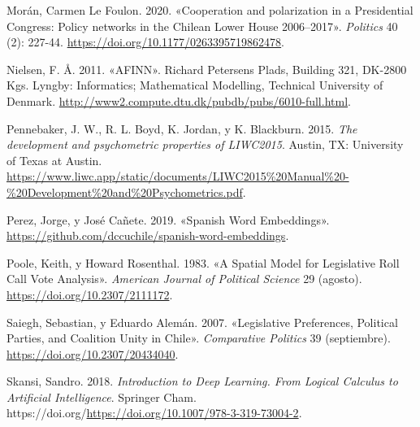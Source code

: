 \documentclass[
  12pt,
]{article}
\newlength{\cslhangindent}
\newlength{\cslentryspacingunit} %
\newenvironment{CSLReferences}[2] %
 {%
  \setlength{\parindent}{0pt}
  \ifodd #1
  \let\oldpar\par
  \def\par{\hangindent=\cslhangindent\oldpar}
  \fi
  \setlength{\parskip}{#2\cslentryspacingunit}
 }%
 {}
\begin{document}
\begin{CSLReferences}{1}{0}
\leavevmode{}%
Morán, Carmen Le Foulon. 2020. {«Cooperation and polarization in a
Presidential Congress: Policy networks in the Chilean Lower House
2006--2017»}. \emph{Politics} 40 (2): 227-44.
\url{https://doi.org/10.1177/0263395719862478}.

\leavevmode{}%
Nielsen, F. Å. 2011. {«AFINN»}. Richard Petersens Plads, Building 321,
{DK-}2800 Kgs. Lyngby: Informatics; Mathematical Modelling, Technical
University of Denmark.
\url{http://www2.compute.dtu.dk/pubdb/pubs/6010-full.html}.

\leavevmode{}%
Pennebaker, J. W., R. L. Boyd, K. Jordan, y K. Blackburn. 2015.
\emph{The development and psychometric properties of LIWC2015}. Austin,
TX: University of Texas at Austin.
\url{https://www.liwc.app/static/documents/LIWC2015\%20Manual\%20-\%20Development\%20and\%20Psychometrics.pdf}.

\leavevmode{}%
Perez, Jorge, y José Cañete. 2019. {«Spanish Word Embeddings»}.
\url{https://github.com/dccuchile/spanish-word-embeddings}.

\leavevmode{}%
Poole, Keith, y Howard Rosenthal. 1983. {«A Spatial Model for
Legislative Roll Call Vote Analysis»}. \emph{American Journal of
Political Science} 29 (agosto). \url{https://doi.org/10.2307/2111172}.

\leavevmode{}%
Saiegh, Sebastian, y Eduardo Alemán. 2007. {«Legislative Preferences,
Political Parties, and Coalition Unity in Chile»}. \emph{Comparative
Politics} 39 (septiembre). \url{https://doi.org/10.2307/20434040}.

\leavevmode{}%
Skansi, Sandro. 2018. \emph{Introduction to Deep Learning. From Logical
Calculus to Artificial Intelligence}. Springer Cham.
https://doi.org/\url{https://doi.org/10.1007/978-3-319-73004-2}.

\end{CSLReferences}
\end{document}
